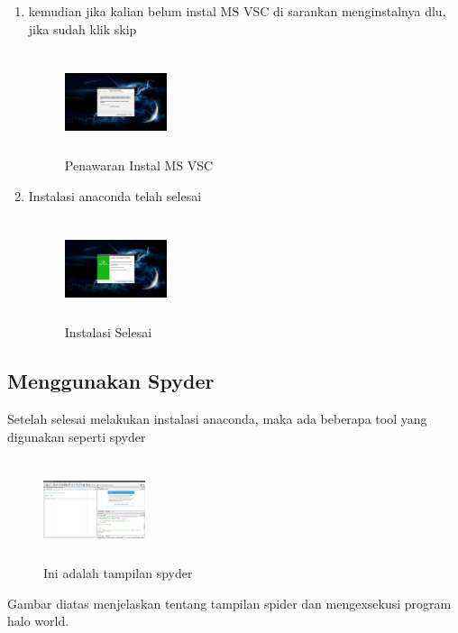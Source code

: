 \begin{enumerate}
    \item kemudian jika kalian belum instal MS VSC di sarankan menginstalnya dlu, jika sudah klik skip
    \begin{figure}[!Htbp]
        \centering
        \includegraphics[width=3cm,height=3cm]{figures/Screenshot(87).png}
        \caption{Penawaran Instal MS VSC}
        \label{offering}
        \end{figure}

    \item Instalasi anaconda telah selesai
    \begin{figure}[!Htbp]
        \centering
        \includegraphics[width=3cm,height=3cm]{figures/Screenshot(88).png}
        \caption{Instalasi Selesai}
        \label{akhir}
        \end{figure}
\end{enumerate}
\subsection{Menggunakan Spyder}
Setelah selesai melakukan instalasi anaconda, maka ada beberapa tool yang digunakan seperti spyder

\begin{figure}[!Htbp]
    \centering
    \includegraphics[width=3cm,height=3cm]{figures/Spyder.png}
    \caption{Ini adalah tampilan spyder}
    \label{spyder}
    \end{figure}

Gambar diatas menjelaskan tentang tampilan spider dan mengexsekusi program halo world.

